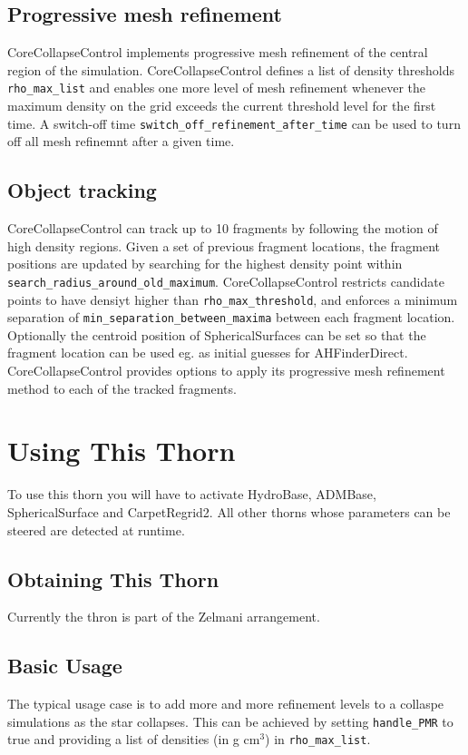 \subsection{Progressive mesh refinement}
CoreCollapseControl implements progressive mesh refinement of the central
region of the simulation. CoreCollapseControl defines a list of density
thresholds \texttt{rho\_max\_list} and enables one more level of mesh
refinement whenever the maximum density on the grid exceeds the current
threshold level for the first time. A switch-off time
\texttt{switch\_off\_refinement\_after\_time} can be used to turn off all mesh
refinemnt after a given time.

\subsection{Object tracking}
CoreCollapseControl can track up to 10 fragments by following the motion of
high density regions. Given a set of previous fragment locations, the fragment
positions are updated by searching for the highest density point within
\texttt{search\_radius\_around\_old\_maximum}. CoreCollapseControl restricts
candidate points to have densiyt higher than \texttt{rho\_max\_threshold}, and
enforces a minimum separation of \texttt{min\_separation\_between\_maxima}
between each fragment location. Optionally the centroid position of
SphericalSurfaces can be set so that the fragment location can be used eg. as
initial guesses for AHFinderDirect. CoreCollapseControl provides options to
apply its progressive mesh refinement method to each of the tracked fragments.

\section{Using This Thorn}
To use this thorn you will have to activate HydroBase, ADMBase,
SphericalSurface and CarpetRegrid2. All other thorns whose parameters can be
steered are detected at runtime.

\subsection{Obtaining This Thorn}
Currently the thron is part of the Zelmani arrangement. 

\subsection{Basic Usage}
The typical usage case is to add more and more refinement levels to a collaspe
simulations as the star collapses. This can be achieved by setting
\texttt{handle\_PMR} to true and providing a list of densities (in g cm$^3$)
in \texttt{rho\_max\_list}.

